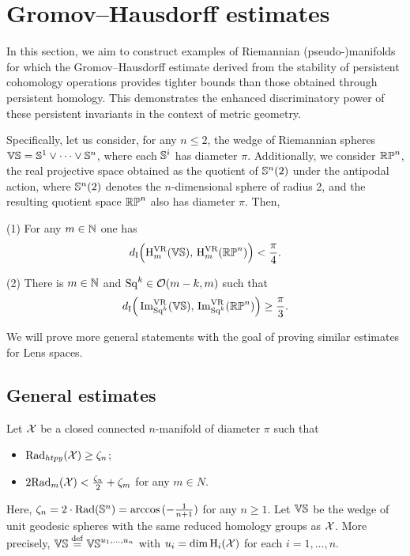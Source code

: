 
\section{Gromov--Hausdorff estimates}\label{s:gh_estimates}

In this section, we aim to construct examples of Riemannian (pseudo-)manifolds for which the Gromov--Hausdorff estimate derived from the stability of persistent cohomology operations provides tighter bounds than those obtained through persistent homology.
This demonstrates the enhanced discriminatory power of these persistent invariants in the context of metric geometry.

Specifically, let us consider, for any \(n \leq 2\), the wedge of Riemannian spheres \(\mathbb{VS} = \mathbb{S}^1 \vee \dots \vee \mathbb{S}^n\), where each \(\mathbb{S}^i\) has diameter \(\pi\).
Additionally, we consider \(\mathbb{RP}^n\), the real projective space obtained as the quotient of \(\mathbb{S}^n(2)\) under the antipodal action, where \(\mathbb{S}^n(2)\) denotes the \(n\)-dimensional sphere of radius 2, and the resulting quotient space \(\mathbb{RP}^n\) also has diameter \(\pi\).
Then,

\medskip (1) For any \(m \in \mathbb{N}\) one has
\[
d_{\mathrm{I}}\Big(\mathrm{H}^{\mathrm{VR}}_m(\mathbb{VS}),\, \mathrm{H}^{\mathrm{VR}}_m(\mathbb{RP}^n)\Big) < \frac{\pi}{4}.
\]

(2) There is \(m \in \mathbb{N}\) and \(\mathrm{Sq}^k \in \mathcal{O}(m-k, m)\) such that
\[
d_{\mathrm{I}}\Big(\operatorname{Im}_{\mathrm{Sq}^k}^{\mathrm{VR}}(\mathbb{VS}),\, \operatorname{Im}_{\mathrm{Sq}^k}^{\mathrm{VR}}(\mathbb{RP}^n)\Big) \geq \frac{\pi}{3}.
\]

We will prove more general statements with the goal of proving similar estimates for Lens spaces.

\subsection{General estimates}

\label{ss:genberal_distance_comparison}

Let $\mathcal{X}$ be a closed connected \(n\)-manifold of diameter $\pi$ such that
\begin{itemize}
    \item $\mathrm{Rad}_{htpy}(\mathcal{X}) \geq \zeta_n $;
    \item $2\mathrm{Rad}_{m}(\mathcal{X}) < \tfrac{\zeta_n}{2}+\zeta_m$ for any $m \in N$.
\end{itemize}
Here, $\zeta_n = 2 \cdot \mathrm{Rad}(\mathbb{S}^n)= \arccos{(-\tfrac{1}{n+1})}$ for any $n\geq 1$.
Let $\mathbb{VS}$ be the wedge of unit geodesic spheres with the same reduced homology groups as $\mathcal{X}$.
More precisely, $\mathbb{VS} \stackrel{\mathrm{def}}{=} \mathbb{VS}^{u_1, \dots, u_n}$ with $u_i = \dim \operatorname{H}_i(\mathcal{X})$ for each $i = 1,\dots, n$.

